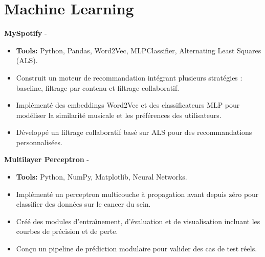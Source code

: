 \documentclass[a4paper,11pt]{article}%
\begin{document}
\section*{Machine Learning}%
%
\noindent \textbf{MySpotify} - \href{https://github.com/sboof911/MySpotify}{{}}%
\begin{itemize}[leftmargin=2em,parsep=0pt,topsep=1em]%
\item[] \textbf{Tools:} Python, Pandas, Word2Vec, MLPClassifier, Alternating Least Squares (ALS).%
\item Construit un moteur de recommandation int\'egrant plusieurs strat\'egies : baseline, filtrage par contenu et filtrage collaboratif.%
\item Impl\'ement\'e des embeddings Word2Vec et des classificateurs MLP pour mod\'eliser la similarit\'e musicale et les pr\'ef\'erences des utilisateurs.%
\item D\'evelopp\'e un filtrage collaboratif bas\'e sur ALS pour des recommandations personnalis\'ees.%
\end{itemize}%
%
\noindent \textbf{Multilayer Perceptron} - \href{https://github.com/sboof911/Multilayer-Perceptron}{{}}%
\begin{itemize}[leftmargin=2em,parsep=0pt,topsep=1em]%
\item[] \textbf{Tools:} Python, NumPy, Matplotlib, Neural Networks.%
\item Impl\'ement\'e un perceptron multicouche \`a propagation avant depuis z\'ero pour classifier des donn\'ees sur le cancer du sein.%
\item Cr\'e\'e des modules d'entra{\^\i}nement, d'\'evaluation et de visualisation incluant les courbes de pr\'ecision et de perte.%
\item Con\c{c}u un pipeline de pr\'ediction modulaire pour valider des cas de test r\'eels.%
\end{itemize}%
%
\end{document}
